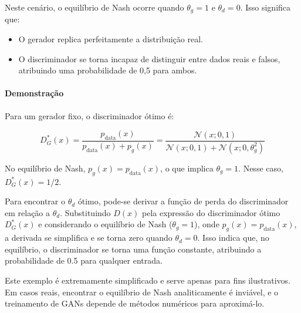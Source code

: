 \documentclass{tufte-handout}
\begin{document}
Neste cenário, o equilíbrio de Nash ocorre quando $\theta_g = 1$ e $\theta_d = 0$. Isso significa que:
\begin{itemize}
    \item O gerador replica perfeitamente a distribuição real.
    \item O discriminador se torna incapaz de distinguir entre dados reais e falsos, atribuindo uma probabilidade de 0,5 para ambos.
\end{itemize}

\paragraph{Demonstração}

Para um gerador fixo, o discriminador ótimo é:

\begin{equation}
D^*_G(x) = \frac{p_{\text{data}}(x)}{p_{\text{data}}(x) + p_g(x)} = \frac{\mathcal{N}(x; 0, 1)}{\mathcal{N}(x; 0, 1) + \mathcal{N}(x; 0, \theta_g^2)}
\end{equation}

No equilíbrio de Nash, $p_g(x) = p_{\text{data}}(x)$, o que implica $\theta_g = 1$. Nesse caso, $D^*_G(x) = 1/2$.

Para encontrar o $\theta_d$ ótimo, pode-se derivar a função de perda do discriminador em relação a $\theta_d$. Substituindo $D(x)$ pela expressão do discriminador ótimo $D^*_G(x)$ e considerando o equilíbrio de Nash ($\theta_g = 1$), onde $p_g(x) = p_{\text{data}}(x)$, a derivada se simplifica e se torna zero quando $\theta_d = 0$. Isso indica que, no equilíbrio, o discriminador se torna uma função constante, atribuindo a probabilidade de 0.5 para qualquer entrada.


Este exemplo é extremamente simplificado e serve apenas para fins ilustrativos. Em casos reais, encontrar o equilíbrio de Nash analiticamente é inviável, e o treinamento de GANs depende de métodos numéricos para aproximá-lo.
\end{document}
